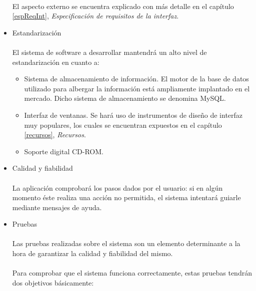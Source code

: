 \begin{itemize}
   \paragraph{}El aspecto externo se encuentra explicado con más detalle en el
   capítulo \ref{espReqInt}, \textit{Especificación de requisitos de la
   interfaz}.

 \item Estandarización

   \paragraph{}El sistema de software a desarrollar mantendrá un alto nivel de
   estandarización en cuanto a:

   \begin{itemize}
      \item Sistema de almacenamiento de información. El motor de la base de
      datos utilizado para albergar la información está ampliamente implantado
      en el mercado. Dicho sistema de almacenamiento se denomina MySQL.
      \item Interfaz de ventanas. Se hará uso de instrumentos de diseño de
      interfaz muy populares, los cuales se encuentran expuestos en el capítulo
      \ref{recursos}, \textit{Recursos}.
      \item Soporte digital CD-ROM.
   \end{itemize}


 \item Calidad y fiabilidad

   \paragraph{}La aplicación comprobará los pasos dados por el usuario: si en
   algún momento éste realiza una acción no permitida, el sistema intentará
   guiarle mediante mensajes de ayuda.

 \item Pruebas

   \paragraph{}Las pruebas realizadas sobre el sistema son un elemento
   determinante a la hora de garantizar la calidad y fiabilidad del mismo.

   \paragraph{}Para comprobar que el sistema funciona correctamente, estas
   pruebas tendrán dos objetivos básicamente:


\end{itemize}
